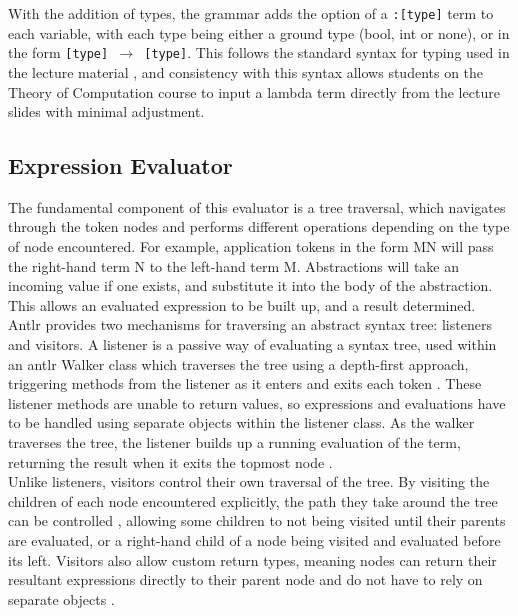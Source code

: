 \documentclass[a4paper,11pt]{report}
\begin{document}
With the addition of types, the grammar adds the option of a \texttt{:[type]} term to each variable, with each type being either a ground type (bool, int or none), or in the form \texttt{[type] $\rightarrow$ [type]}. This follows the standard syntax for typing used in the lecture material \cite{Hankin2004} \cite{Gay2019}, and consistency with this syntax allows students on the Theory of Computation course to input a lambda term directly from the lecture slides with minimal adjustment.

\subsection{Expression Evaluator}

The fundamental component of this evaluator is a tree traversal, which navigates through the token nodes and performs different operations depending on the type of node encountered. For example, application tokens in the form MN will pass the right-hand term N to the left-hand term M. Abstractions will take an incoming value if one exists, and substitute it into the body of the abstraction. This allows an evaluated expression to be built up, and a result determined.\\

Antlr provides two mechanisms for traversing an abstract syntax tree: listeners and visitors. A listener is a passive way of evaluating a syntax tree, used within an antlr Walker class which traverses the tree using a depth-first approach, triggering methods from the listener as it enters and exits each token \cite{Parr2012}. These listener methods are unable to return values, so expressions and evaluations have to be handled using separate objects within the listener class. As the walker traverses the tree, the listener builds up a running evaluation of the term, returning the result when it exits the topmost node \cite{Srivastav2017}.\\

Unlike listeners, visitors control their own traversal of the tree. By visiting the children of each node encountered explicitly, the path they take around the tree can be controlled \cite{Parr2012}, allowing some children to not being visited until their parents are evaluated, or a right-hand child of a node being visited and evaluated before its left. Visitors also allow custom return types, meaning nodes can return their resultant expressions directly to their parent node and do not have to rely on separate objects \cite{Srivastav2017}.\\
\end{document}
